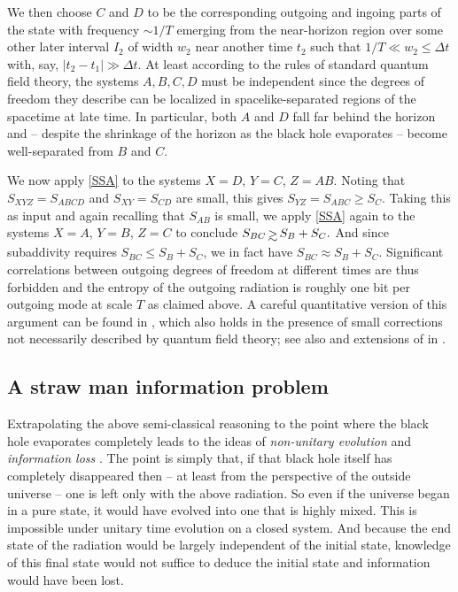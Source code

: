 \documentclass[12pt]{article}
\def\gsim{\, \rlap{$>$}{\lower 1.1ex\hbox{$\sim$}}\,}
\begin{document}
We then choose $C$ and $D$ to be the corresponding outgoing and ingoing parts of the state with frequency $\sim 1/T$ emerging from the near-horizon region over some other later interval $I_2$ of width $w_2$ near another time $t_2$ such that $1/T \ll w_2 \le \Delta t$ with, say, $|t_2 - t_1| \gg \Delta t$. At least according to the rules of standard quantum field theory, the systems $A,B,C,D$ must be independent since the degrees of freedom they describe can be localized in spacelike-separated regions of the spacetime at late time.  In particular, both $A$ and $D$ fall far behind the horizon and -- despite the shrinkage of the horizon as the black hole evaporates -- become well-separated from $B$ and $C$.

We now apply \eqref{SSA} to the systems $X=D$, $Y=C$, $Z=AB$.  Noting that $S_{XYZ} = S_{ABCD}$ and $S_{XY} = S_{CD}$ are small, this gives $S_{YZ} = S_{ABC} \ge S_C$.  Taking this as input and again recalling that $S_{AB}$ is small, we apply \eqref{SSA} again to the systems  $X=A$, $Y=B$, $Z=C$ to conclude $S_{BC} \gsim S_B + S_C.$  And since subaddivity requires $S_{BC} \le S_B + S_C$, we in fact have $S_{BC} \approx S_B + S_C$. Significant correlations between outgoing degrees of freedom at different times are thus forbidden and the entropy of the outgoing radiation is roughly one bit per outgoing mode at scale $T$ as claimed above.  A careful quantitative version of this argument can be found in \cite{Mathur:2009hf}, which also holds in the presence of small corrections not necessarily described by quantum field theory; see also \cite{Sorkin:1997ja,Giddings:2006sj,Braunstein:2009my}  and extensions of \cite{Mathur:2009hf} in \cite{Giddings:2012dh}.

\subsection{A straw man information problem}
\label{straw}

Extrapolating the above semi-classical reasoning to the point where the black hole evaporates completely leads to the ideas of  {\it non-unitary evolution} and {\it information loss} \cite{Hawking:1976ra}.  The point is simply that, if that black hole itself has completely disappeared then -- at least from the perspective of the outside universe -- one is left only with the above radiation.  So even if the universe began in a pure state, it would have evolved into one that is highly mixed.  This is impossible under unitary time evolution on a closed system.  And because the end state of the radiation would be largely independent of the initial state, knowledge of this final state would not suffice to deduce the initial state and information would have been lost.
\end{document}
